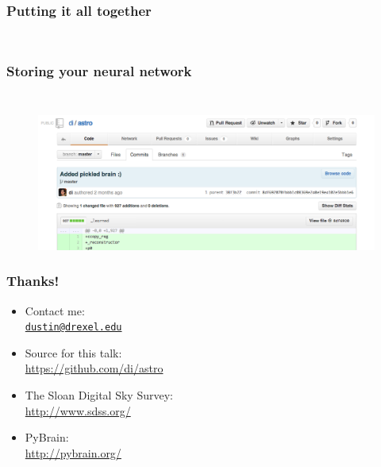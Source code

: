 \documentclass{beamer}
\begin{document}
\begin{frame}[fragile]
    \frametitle{Putting it all together}
    \inputminted[firstline=59,lastline=60,linenos,frame=lines,firstnumber=59,gobble=8]{python}{brain.py}
    \inputminted[firstline=66,lastline=67,linenos,frame=lines,firstnumber=66,gobble=4]{python}{brain.py}
\end{frame}

\begin{frame}
    \frametitle{Storing your neural network}
    \inputminted[firstline=8,lastline=8,linenos,frame=lines,firstnumber=8]{python}{brain.py}
    \inputminted[firstline=53,lastline=63,linenos,frame=lines,firstnumber=53]{python}{brain.py}
\end{frame}

\begin{frame}
    \begin{figure}
        \centering
        \includegraphics[height=\paperheight]{pickle.png}
    \end{figure}

\end{frame}

\begin{frame}
    \frametitle{Thanks!}
    \begin{itemize}
        \item Contact me:\\\texttt{\href{mailto:dustin@drexel.edu}{dustin@drexel.edu}}
        \item Source for this talk:\\ \url{https://github.com/di/astro}
        \item The Sloan Digital Sky Survey:\\ \url{http://www.sdss.org/}
        \item PyBrain:\\ \url{http://pybrain.org/}
    \end{itemize}
\end{frame}
\end{document}
